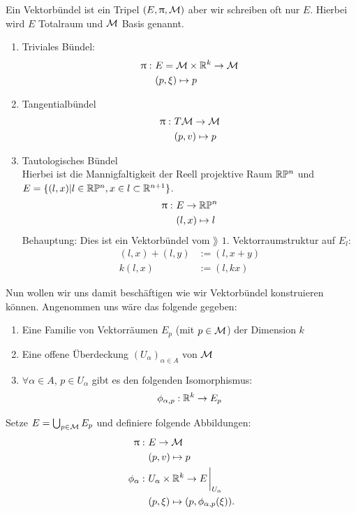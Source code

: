 \begin{bem}
Ein Vektorbündel ist ein Tripel $(E, \uppi, \mathcal{M})$ aber wir schreiben oft nur $E$. Hierbei wird $E$ Totalraum und $\mathcal{M}$ Basis genannt.
\end{bem}
\begin{bsp} \leavevmode
\begin{enumerate}
\item Triviales Bündel:
\begin{align*}
\uppi : \ &E = \mathcal{M} \times \mathbb{R}^k \to \mathcal{M}\\
&(p, \xi) \mapsto p
\end{align*}
\item Tangentialbündel 
\begin{align*}
\uppi: \ &T\mathcal{M} \to \mathcal{M}\\
&(p, v) \mapsto p
\end{align*}

\item Tautologisches Bündel\\
Hierbei ist die Mannigfaltigkeit der Reell projektive Raum $\mathbb{R} \mathbb{P}^n$ und $E = \{ (l, x) \vert l \in \mathbb{R} \mathbb{P}^n, x\in l \subset \mathbb{R}^{n+1} \}$.
\begin{align*}
\uppi: \ &E \to \mathbb{R} \mathbb{P}^n\\
&(l, x) \mapsto l
\end{align*}
Behauptung: Dies ist ein Vektorbündel vom $\rang$ $1$.
Vektorraumstruktur auf $E_l$:
\begin{align*}
(l, x) + (l, y) &:= (l, x + y)\\
k (l, x) &:= (l, k x)
\end{align*}
\end{enumerate}
\end{bsp}
Nun wollen wir uns damit beschäftigen wie wir Vektorbündel konstruieren können.
Angenommen uns wäre das folgende gegeben:
\begin{enumerate}
\item  Eine Familie von Vektorräumen $E_p$ (mit $p\in \mathcal{M}$) der Dimension $k$
\item  Eine offene Überdeckung $(U_\alpha)_{\alpha \in A}$ von $\mathcal{M}$
\item $\forall \alpha \in A$, $p\in U_\alpha$ gibt es den folgenden Isomorphismus:
\begin{align}
\phi_{\alpha, p}: \mathbb{R}^k \to E_p
\end{align}
\end{enumerate}
Setze $E = \bigcup_{p \in \mathcal{M}} E_p$ und definiere folgende Abbildungen:
\begin{align*}
\pi : \ &E \to \mfk\\
&(p, v) \mapsto p\\
\phi_\alpha: \ &U_\alpha \times \R^k \to E \eval_{U_\alpha}\\
&(p, \xi) \mapsto (p, \phi_{\alpha, p}(\xi)).
\end{align*}
